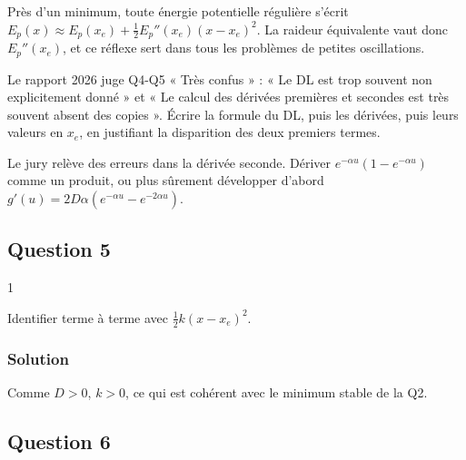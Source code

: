 \documentclass[11pt,a4paper]{article}
\newcommand{\equationajustee}[1]{%
  \sbox{\boiteequation}{$\displaystyle #1$}%
  \ifdim\wd\boiteequation>\linewidth
    \[\resizebox{\linewidth}{!}{\usebox{\boiteequation}}\]%
  \else
    \[#1\]%
  \fi}
\begin{document}
\begin{methode}

Près d'un minimum, toute énergie potentielle régulière s'écrit \(E_p(x)\approx E_p(x_e)+\tfrac12E_p''(x_e)(x-x_e)^2\). La raideur équivalente vaut donc \(E_p''(x_e)\), et ce réflexe sert dans tous les problèmes de petites oscillations.

\end{methode}

\begin{jury}

Le rapport 2026 juge Q4-Q5 « Très confus » : « Le DL est trop souvent non explicitement donné » et « Le calcul des dérivées premières et secondes est très souvent absent des copies ». Écrire la formule du DL, puis les dérivées, puis leurs valeurs en \(x_e\), en justifiant la disparition des deux premiers termes.

\end{jury}

\begin{piege}

Le jury relève des erreurs dans la dérivée seconde. Dériver \(e^{-\alpha u}(1-e^{-\alpha u})\) comme un produit, ou plus sûrement développer d'abord \(g'(u)=2D\alpha(e^{-\alpha u}-e^{-2\alpha u})\).

\end{piege}

\hypertarget{question-5}{%
\subsection{Question 5}\label{question-5}}

\begin{indication}{1}

Identifier terme à terme avec \(\tfrac12k(x-x_e)^2\).

\end{indication}

\hypertarget{solution-4}{%
\subsubsection{Solution}\label{solution-4}}

\equationajustee{\boxed{k=2D\alpha^2}}
Comme \(D>0\), \textbf{\(k>0\)}, ce qui est cohérent avec le minimum stable de la Q2.

\hypertarget{question-6}{%
\subsection{Question 6}\label{question-6}}
\end{document}
